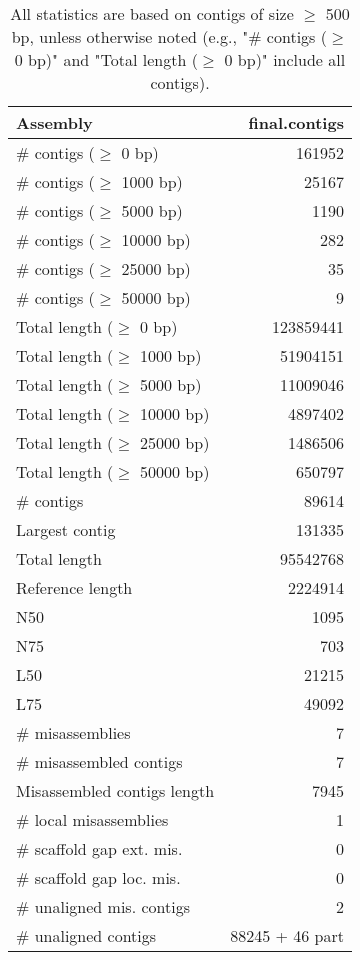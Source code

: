 \documentclass[12pt,a4paper]{article}
\begin{document}
\begin{table}[ht]
\begin{center}
\caption{All statistics are based on contigs of size $\geq$ 500 bp, unless otherwise noted (e.g., "\# contigs ($\geq$ 0 bp)" and "Total length ($\geq$ 0 bp)" include all contigs).}
\begin{tabular}{|l*{1}{|r}|}
\hline
Assembly & final.contigs \\ \hline
\# contigs ($\geq$ 0 bp) & 161952 \\ \hline
\# contigs ($\geq$ 1000 bp) & 25167 \\ \hline
\# contigs ($\geq$ 5000 bp) & 1190 \\ \hline
\# contigs ($\geq$ 10000 bp) & 282 \\ \hline
\# contigs ($\geq$ 25000 bp) & 35 \\ \hline
\# contigs ($\geq$ 50000 bp) & 9 \\ \hline
Total length ($\geq$ 0 bp) & 123859441 \\ \hline
Total length ($\geq$ 1000 bp) & 51904151 \\ \hline
Total length ($\geq$ 5000 bp) & 11009046 \\ \hline
Total length ($\geq$ 10000 bp) & 4897402 \\ \hline
Total length ($\geq$ 25000 bp) & 1486506 \\ \hline
Total length ($\geq$ 50000 bp) & 650797 \\ \hline
\# contigs & 89614 \\ \hline
Largest contig & 131335 \\ \hline
Total length & 95542768 \\ \hline
Reference length & 2224914 \\ \hline
N50 & 1095 \\ \hline
N75 & 703 \\ \hline
L50 & 21215 \\ \hline
L75 & 49092 \\ \hline
\# misassemblies & 7 \\ \hline
\# misassembled contigs & 7 \\ \hline
Misassembled contigs length & 7945 \\ \hline
\# local misassemblies & 1 \\ \hline
\# scaffold gap ext. mis. & 0 \\ \hline
\# scaffold gap loc. mis. & 0 \\ \hline
\# unaligned mis. contigs & 2 \\ \hline
\# unaligned contigs & 88245 + 46 part \\ \hline

\end{tabular}
\end{center}
\end{table}
\end{document}
